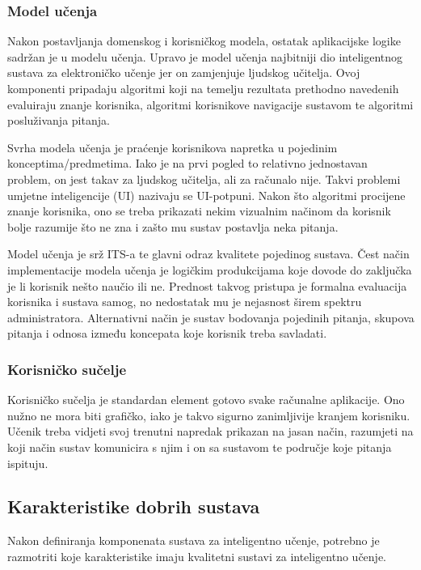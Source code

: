 \documentclass[times, utf8, zavrsni]{fer}
\begin{document}
\subsubsection{Model učenja}
Nakon postavljanja domenskog i korisničkog modela, ostatak aplikacijske logike sadržan je u modelu učenja. Upravo je model učenja najbitniji dio inteligentnog sustava za elektroničko učenje jer on zamjenjuje ljudskog učitelja. Ovoj komponenti pripadaju algoritmi koji na temelju rezultata prethodno navedenih evaluiraju znanje korisnika, algoritmi korisnikove navigacije sustavom te algoritmi posluživanja pitanja.
\par
Svrha modela učenja je praćenje korisnikova napretka u pojedinim konceptima/predmetima. Iako je na prvi pogled to relativno jednostavan problem, on jest takav za ljudskog učitelja, ali za računalo nije. Takvi problemi umjetne inteligencije (UI) nazivaju se UI-potpuni. Nakon što algoritmi procijene znanje korisnika, ono se treba prikazati nekim vizualnim načinom da korisnik bolje razumije što ne zna i zašto mu sustav postavlja neka pitanja.
\par
Model učenja je srž ITS-a te glavni odraz kvalitete pojedinog sustava. Čest način implementacije modela učenja je logičkim produkcijama koje dovode do zaključka je li korisnik nešto naučio ili ne. Prednost takvog pristupa je formalna evaluacija korisnika i sustava samog, no nedostatak mu je nejasnost širem spektru administratora. Alternativni način je sustav bodovanja pojedinih pitanja, skupova pitanja i odnosa između koncepata koje korisnik treba savladati.

\subsubsection{Korisničko sučelje}
Korisničko sučelja je standardan element gotovo svake računalne aplikacije. Ono nužno ne mora biti grafičko, iako je takvo sigurno zanimljivije kranjem korisniku. Učenik treba vidjeti svoj trenutni napredak prikazan na jasan način, razumjeti na koji način sustav komunicira s njim i on sa sustavom te područje koje pitanja ispituju.

\subsection{Karakteristike dobrih sustava}
Nakon definiranja komponenata sustava za inteligentno učenje, potrebno je razmotriti koje karakteristike imaju kvalitetni sustavi za inteligentno učenje.
\end{document}
